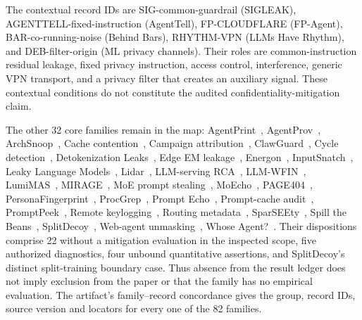 The contextual record IDs are SIG-common-guardrail (SIGLEAK), AGENTTELL-fixed-instruction (AgentTell), FP-CLOUDFLARE (FP-Agent), BAR-co-running-noise (Behind Bars), RHYTHM-VPN (LLMs Have Rhythm), and DEB-filter-origin (ML privacy channels). Their roles are common-instruction residual leakage, fixed privacy instruction, access control, interference, generic VPN transport, and a privacy filter that creates an auxiliary signal. These contextual conditions do not constitute the audited confidentiality-mitigation claim.

The other 32 core families remain in the map: AgentPrint~\cite{agentprint2025}, AgentProv~\cite{wang2026agentprov}, ArchSnoop~\cite{weng2026archsnoop}, Cache contention~\cite{abubakar2026contention}, Campaign attribution~\cite{park2026crosscampaign}, ClawGuard~\cite{gan2026clawguard}, Cycle detection~\cite{george2025cycles}, Detokenization Leaks~\cite{weiss2026detokenization}, Edge EM leakage~\cite{alhalawani2026physicaledge}, Energon~\cite{chaudhuri2025energon}, InputSnatch~\cite{inputsnatch2024}, Leaky Language Models~\cite{majidi2026leakylms}, Lidar~\cite{wang2026lidar}, LLM-serving RCA~\cite{scheinert2026rca}, LLM-WFIN~\cite{jiao2025llmwfin}, LumiMAS~\cite{solomon2026lumimas}, MIRAGE~\cite{revankar2026mirage}, MoE prompt stealing~\cite{yona2024stealing}, MoEcho~\cite{ding2025moecho}, PAGE404~\cite{nazaraliyev2026page404}, PersonaFingerprint~\cite{song2026personafingerprint}, ProcGrep~\cite{oderinwale2026procgrep}, Prompt Echo~\cite{prompt_echo2026}, Prompt-cache audit~\cite{gu2025promptcaching}, PromptPeek~\cite{promptpeek2025}, Remote keylogging~\cite{weiss2024prompt}, Routing metadata~\cite{chen2026routingmetadata}, SparSEEty~\cite{jo2026sparseety}, Spill the Beans~\cite{spillbeans2025}, SplitDecoy~\cite{politis2026splitdecoy}, Web-agent unmasking~\cite{fayolle2026webagents}, Whose Agent?~\cite{kang2026whoseagent}. Their dispositions comprise 22 without a mitigation evaluation in the inspected scope, five authorized diagnostics, four unbound quantitative assertions, and SplitDecoy's distinct split-training boundary case. Thus absence from the result ledger does not imply exclusion from the paper or that the family has no empirical evaluation. The artifact's family--record concordance gives the group, record IDs, source version and locators for every one of the 82 families.

